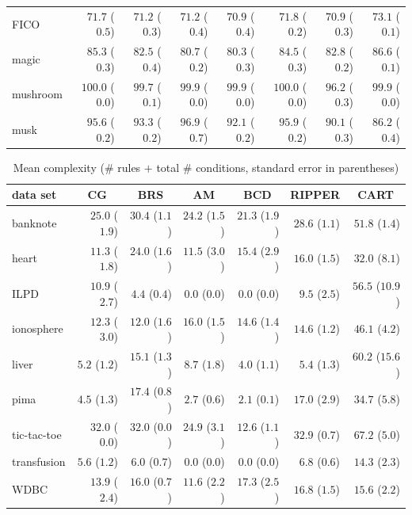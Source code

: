 \documentclass[twoside,11pt]{article}
\begin{document}
\begin{table}
\begin{tabular}{lrrrrrrr}
FICO&$71.7$ ($0.5$)&$71.2$ ($0.3$)&$71.2$ ($0.4$)&$70.9$ ($0.4$)&$\mathbf{71.8}$ ($0.2$)&$70.9$ ($0.3$)&$\mathit{73.1}$  ($0.1$)\\ 
magic&$\mathbf{85.3}$ ($0.3$)&$82.5$ ($0.4$)&$80.7$ ($0.2$)&$80.3$ ($0.3$)&$84.5$ ($0.3$)&$82.8$ ($0.2$)&$\mathit{86.6}$ ($0.1$)\\
mushroom&$\bm{\mathit{100.0}}$ ($0.0$)&$99.7$ ($0.1$)&$99.9$ ($0.0$)&$99.9$ ($0.0$)&$\bm{\mathit{100.0}}$ ($0.0$)&$96.2$ ($0.3$)&$99.9$ ($0.0$)\\
musk&$95.6$ ($0.2$)&$93.3$ ($0.2$)&$\bm{\mathit{96.9}}$ ($0.7$)&$92.1$ ($0.2$)&$95.9$ ($0.2$)&$90.1$ ($0.3$)&$86.2$ ($0.4$)\\
\bottomrule
\end{tabular}
\end{table}


\begin{table}[t]
\caption{Mean complexity (\# rules $+$ total \# conditions, standard error in parentheses)}
\label{tbl:complex}
\centering
\footnotesize
\begin{tabular}{lrrrrrr}%
\toprule
data set&\multicolumn{1}{c}{CG}&\multicolumn{1}{c}{BRS}&\multicolumn{1}{c}{AM}&\multicolumn{1}{c}{BCD}&\multicolumn{1}{c}{RIPPER}&\multicolumn{1}{c}{CART}\\
\midrule
banknote&$25.0$ ($1.9$)&$30.4$ ($1.1$)&$24.2$ ($1.5$)&$\mathbf{21.3}$ ($1.9$)&$28.6$ ($1.1$)&$51.8$ ($1.4$)\\
heart&$\mathbf{11.3}$ ($1.8$)&$24.0$ ($1.6$)&$11.5$ ($3.0$)&$15.4$ ($2.9$)&$16.0$ ($1.5$)&$32.0$ ($8.1$)\\
ILPD&$10.9$ ($2.7$)&$4.4$ ($0.4$)&$\mathbf{0.0}$ ($0.0$)&$\mathbf{0.0}$ ($0.0$)&$9.5$ ($2.5$)&$56.5$ ($10.9$)\\
ionosphere&$12.3$ ($3.0$)&$\mathbf{12.0}$ ($1.6$)&$16.0$ ($1.5$)&$14.6$ ($1.4$)&$14.6$ ($1.2$)&$46.1$ ($4.2$)\\
liver&$5.2$ ($1.2$)&$15.1$ ($1.3$)&$8.7$ ($1.8$)&$\mathbf{4.0}$ ($1.1$)&$5.4$ ($1.3$)&$60.2$ ($15.6$)\\
pima&$4.5$ ($1.3$)&$17.4$ ($0.8$)&$2.7$ ($0.6$)&$\mathbf{2.1}$ ($0.1$)&$17.0$ ($2.9$)&$34.7$ ($5.8$)\\
tic-tac-toe&$32.0$ ($0.0$)&$32.0$ ($0.0$)&$24.9$ ($3.1$)&$\mathbf{12.6}$ ($1.1$)&$32.9$ ($0.7$)&$67.2$ ($5.0$)\\
transfusion&$5.6$ ($1.2$)&$6.0$ ($0.7$)&$\mathbf{0.0}$ ($0.0$)&$\mathbf{0.0}$ ($0.0$)&$6.8$ ($0.6$)&$14.3$ ($2.3$)\\
WDBC&$13.9$ ($2.4$)&$16.0$ ($0.7$)&$\mathbf{11.6}$ ($2.2$)&$17.3$ ($2.5$)&$16.8$ ($1.5$)&$15.6$ ($2.2$)\\

\end{tabular}
\end{table}
\end{document}
